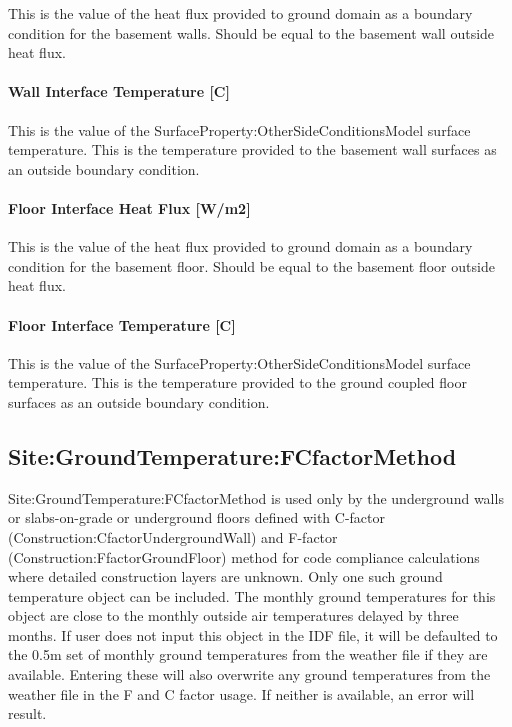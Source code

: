 This is the value of the heat flux provided to ground domain as a boundary condition for the basement walls. Should be equal to the basement wall outside heat flux.

\paragraph{Wall Interface Temperature {[}C{]}}\label{wall-interface-temperature-c}

This is the value of the SurfaceProperty:OtherSideConditionsModel surface temperature. This is the temperature provided to the basement wall surfaces as an outside boundary condition.

\paragraph{Floor Interface Heat Flux {[}W/m2{]}}\label{floor-interface-heat-flux-wm2}

This is the value of the heat flux provided to ground domain as a boundary condition for the basement floor. Should be equal to the basement floor outside heat flux.

\paragraph{Floor Interface Temperature {[}C{]}}\label{floor-interface-temperature-c}

This is the value of the SurfaceProperty:OtherSideConditionsModel surface temperature. This is the temperature provided to the ground coupled floor surfaces as an outside boundary condition.

\subsection{Site:GroundTemperature:FCfactorMethod}\label{sitegroundtemperaturefcfactormethod}

Site:GroundTemperature:FCfactorMethod is used only by the underground walls or slabs-on-grade or underground floors defined with C-factor (Construction:CfactorUndergroundWall) and F-factor (Construction:FfactorGroundFloor) method for code compliance calculations where detailed construction layers are unknown. Only one such ground temperature object can be included. The monthly ground temperatures for this object are close to the monthly outside air temperatures delayed by three months. If user does not input this object in the IDF file, it will be defaulted to the 0.5m set of monthly ground temperatures from the weather file if they are available. Entering these will also overwrite any ground temperatures from the weather file in the F and C factor usage. If neither is available, an error will result.

